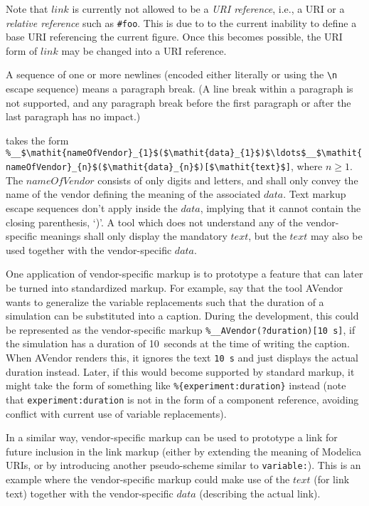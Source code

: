 \begin{nonnormative}
Note that $\mathit{link}$ is currently not allowed to be a \emph{URI reference}, i.e., a URI or a \emph{relative reference} such as \lstinline!#foo!.  This is due to to the current inability to define a base URI referencing the current figure.  Once this becomes possible, the URI form of $\mathit{link}$ may be changed into a URI reference.
\end{nonnormative}

A sequence of one or more newlines (encoded either literally or using the \lstinline!\n!
escape sequence) means a paragraph break.  (A line break within a paragraph is
not supported, and any paragraph break before the first paragraph or after the last
paragraph has no impact.)

 takes the form \lstinline!%__$\mathit{nameOfVendor}_{1}$($\mathit{data}_{1}$)$\ldots$__$\mathit{nameOfVendor}_{n}$($\mathit{data}_{n}$)[$\mathit{text}$]!, where $n \geq 1$.
The $\mathit{nameOfVendor}$ consists of only digits and letters, and shall only convey the name of the vendor defining the meaning of the associated $\mathit{data}$.
Text markup escape sequences don't apply inside the $\mathit{data}$, implying that it cannot contain the closing parenthesis, `)'.
A tool which does not understand any of the vendor-specific meanings shall only display the mandatory $\mathit{text}$, but the $\mathit{text}$ may also be used together with the vendor-specific $\mathit{data}$.

\begin{example}
One application of vendor-specific markup is to prototype a feature that can later be turned into standardized markup.  For example, say that the tool AVendor wants to generalize the variable replacements such that the duration of a simulation can be substituted into a caption.  During the development, this could be represented as the vendor-specific markup \lstinline!%__AVendor(?duration)[10 s]!, if the simulation has a duration of 10~seconds at the time of writing the caption.  When AVendor renders this, it ignores the text \lstinline!10 s! and just displays the actual duration instead.  Later, if this would become supported by standard markup, it might take the form of something like \lstinline!%{experiment:duration}! instead (note that \lstinline!experiment:duration! is not in the form of a component reference, avoiding conflict with current use of variable replacements).

In a similar way, vendor-specific markup can be used to prototype a link for future inclusion in the link markup (either by extending the meaning of Modelica URIs, or by introducing another pseudo-scheme similar to \lstinline!variable:!).  This is an example where the vendor-specific markup could make use of the $\mathit{text}$ (for link text) together with the vendor-specific $\mathit{data}$ (describing the actual link).
\end{example}

